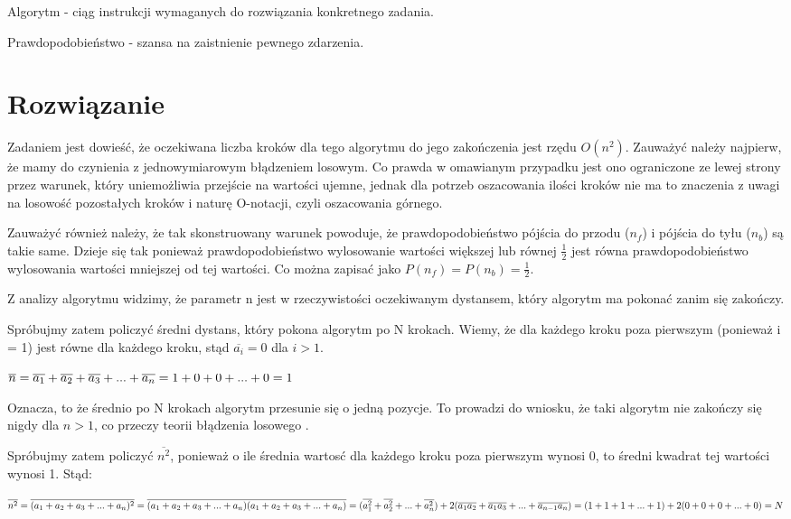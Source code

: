 \documentclass[12pt,oneside,a4paper]{book} %
\theoremstyle{break}
\begin{document}
Algorytm - ciąg instrukcji wymaganych do rozwiązania konkretnego zadania.

Prawdopodobieństwo - szansa na zaistnienie pewnego zdarzenia.

\chapter*{Rozwiązanie}

Zadaniem jest dowieść, że oczekiwana liczba kroków dla tego algorytmu do jego zakończenia jest rzędu $O(n^2)$. Zauważyć należy najpierw, że mamy do czynienia z jednowymiarowym błądzeniem losowym. Co prawda w omawianym przypadku jest ono ograniczone ze lewej strony przez warunek, który uniemożliwia przejście na wartości ujemne, jednak dla potrzeb oszacowania ilości kroków nie ma to znaczenia z uwagi na losowość pozostałych kroków i naturę O-notacji, czyli oszacowania górnego.

Zauważyć również należy, że tak skonstruowany warunek powoduje, że prawdopodobieństwo pójścia do przodu ($n_f$) i pójścia do tyłu ($n_b$) są takie same. Dzieje się tak ponieważ prawdopodobieństwo wylosowanie wartości większej lub równej $\frac{1}{2}$ jest równa prawdopodobieństwo wylosowania wartości mniejszej od tej wartości. Co można zapisać jako $P(n_f)=P(n_b)=\frac{1}{2}$.

Z analizy algorytmu widzimy, że parametr n jest w rzeczywistości oczekiwanym dystansem, który algorytm ma pokonać zanim się zakończy.

Spróbujmy zatem policzyć średni dystans, który pokona algorytm po N krokach. Wiemy, że dla każdego kroku poza pierwszym (ponieważ i = 1) jest równe dla każdego kroku, stąd $\overline{a_i}=0$ dla $i > 1$.

\begin{math}
  \centering
  \overline{n}= \overline{a_1}+\overline{a_2}+\overline{a_3}+...+\overline{a_n}=1+0+0+...+0=1
\end{math}

Oznacza, to że średnio po N krokach algorytm przesunie się o jedną pozycje. To prowadzi do wniosku, że taki algorytm nie zakończy się nigdy dla $n > 1$, co przeczy teorii błądzenia losowego \cite{viriginaRandomWalk}.

Spróbujmy zatem policzyć $\overline{n^2}$, ponieważ o ile średnia wartosć dla każdego kroku poza pierwszym wynosi 0, to średni kwadrat tej wartości wynosi 1. Stąd:

\begin{math}
  \centering
  \overline{n^2} = \overline{(a_1 + a_2 + a_3 + ... + a_n)^2} = \overline{(a_1 + a_2 + a_3 + ... + a_n)(a_1 + a_2 + a_3 + ... + a_n)} = (\overline{a_1^2} + \overline{a_2^2} + ... + \overline{a_n^2}) + 2(\overline{a_1a_2} + \overline{a_1a_3} + ... + \overline{a_{n-1}a_n}) = (1 + 1 + 1 + ... + 1) + 2(0 + 0 + 0 + ... + 0) = N
\end{math}
\end{document}
